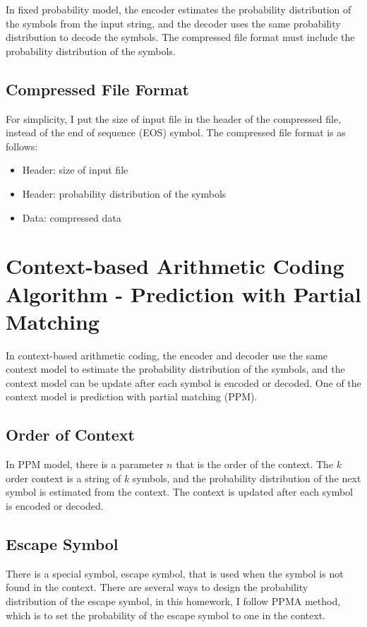 \documentclass[a4paper,conference]{IEEEtran}
\begin{document}
In fixed probability model, the encoder estimates the probability distribution of the symbols from the input string, and the decoder uses the same probability distribution to decode the symbols. The compressed file format must include the probability distribution of the symbols.

\subsection{Compressed File Format}

For simplicity, I put the size of input file in the header of the compressed file, instead of the end of sequence (EOS) symbol. The compressed file format is as follows:

\begin{itemize}
    \item Header: size of input file
    \item Header: probability distribution of the symbols
    \item Data: compressed data
\end{itemize}

\section{Context-based Arithmetic Coding Algorithm - Prediction with Partial Matching}

In context-based arithmetic coding, the encoder and decoder use the same context model to estimate the probability distribution of the symbols, and the context model can be update after each symbol is encoded or decoded. One of the context model is prediction with partial matching (PPM).

\subsection{Order of Context}

In PPM model, there is a parameter $n$ that is the order of the context. The $k$ order context is a string of $k$ symbols, and the probability distribution of the next symbol is estimated from the context. The context is updated after each symbol is encoded or decoded.

\subsection{Escape Symbol}

There is a special symbol, escape symbol, that is used when the symbol is not found in the context. There are several ways to design the probability distribution of the escape symbol, in this homework, I follow PPMA method, which is to set the probability of the escape symbol to one in the context.
\end{document}
